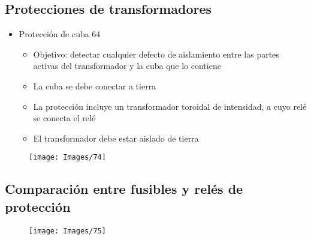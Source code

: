 \subsection{Protecciones de transformadores}
\begin{itemize}
	\item Protección de cuba 64
	\begin{itemize}
		\item Objetivo: detectar cualquier defecto de
		aislamiento entre las partes activas del
		transformador y la cuba que lo contiene
		\item La cuba se debe conectar a tierra
		\item La protección incluye un transformador toroidal
		de intensidad, a cuyo relé se conecta el relé
		\item El transformador debe estar aislado de tierra
	\end{itemize}
\end{itemize}
\begin{figure}[H]
	\centering
	\texttt{[image: Images/74]}
	\label{fig:74}
\end{figure}

\subsection{Comparación entre fusibles y relés de protección}
\begin{figure}[H]
	\centering
	\texttt{[image: Images/75]}
	\label{fig:75}
\end{figure}

